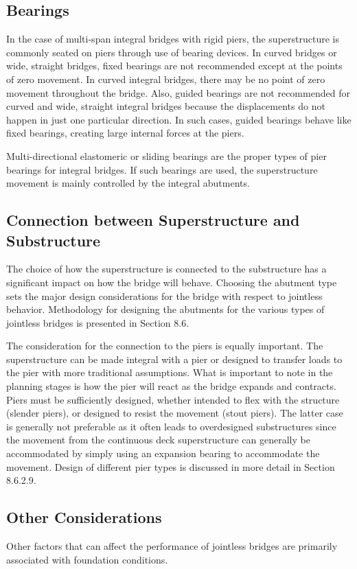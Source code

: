 \subsection{Bearings}
In the case of multi-span integral bridges with rigid piers, the superstructure is commonly seated on piers through
use of bearing devices. In curved bridges or wide, straight bridges, fixed bearings are not recommended except at the
points of zero movement. In curved integral bridges, there may be no point of zero movement throughout the bridge.
Also, guided bearings are not recommended for curved and wide, straight integral bridges because the displacements
do not happen in just one particular direction. In such cases, guided bearings behave like fixed bearings, creating large
internal forces at the piers.

Multi-directional elastomeric or sliding bearings are the proper types of pier bearings for integral bridges. If such
bearings are used, the superstructure movement is mainly controlled by the integral abutments.

\subsection{Connection between Superstructure and Substructure}
The choice of how the superstructure is connected to the substructure has a significant impact on how the bridge
will behave. Choosing the abutment type sets the major design considerations for the bridge with respect to jointless
behavior. Methodology for designing the abutments for the various types of jointless bridges is presented in Section
8.6.

The consideration for the connection to the piers is equally important. The superstructure can be made integral
with a pier or designed to transfer loads to the pier with more traditional assumptions. What is important to note in
the planning stages is how the pier will react as the bridge expands and contracts. Piers must be sufficiently designed,
whether intended to flex with the structure (slender piers), or designed to resist the movement (stout piers). The latter
case is generally not preferable as it often leads to overdesigned substructures since the movement from the
continuous deck superstructure can generally be accommodated by simply using an expansion bearing to
accommodate the movement. Design of different pier types is discussed in more detail in Section 8.6.2.9.

\subsection{Other Considerations}
Other factors that can affect the performance of jointless bridges are primarily associated with foundation
conditions.

